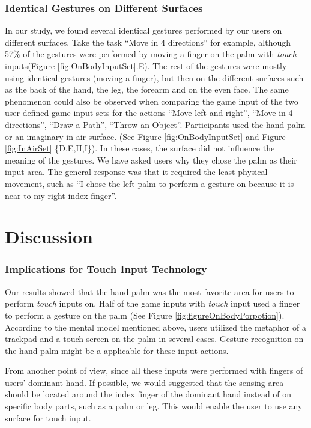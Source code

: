 \documentclass{sigchi}
\begin{document}
\subsubsection{Identical Gestures on Different Surfaces}
 In our study, we found several identical gestures performed by our users on different surfaces. Take the task ``Move in 4 directions'' for example, although 57\% of the gestures were performed by moving a finger on the palm with \emph{touch} inputs(Figure \ref{fig:OnBodyInputSet}.E). The rest of the gestures were mostly using identical gestures (moving a finger), but then on the different surfaces such as the back of the hand, the leg, the forearm and on the even face. The same phenomenon could also be observed when comparing the game input of the two user-defined game input sets for the actions ``Move left and right'', ``Move in 4 directions'', ``Draw a Path'', ``Throw an Object''. Participants used the hand palm or an imaginary in-air surface. 
 (See Figure \ref{fig:OnBodyInputSet} and Figure \ref{fig:InAirSet} \{D,E,H,I\}). In these cases, the surface did not influence the meaning of the gestures. We have asked users why they chose the palm as their input area. The general response was that it required the least physical movement, such as ``I chose the left palm to perform a gesture on because it is near to my right index finger''. 

  \section{Discussion}

    \subsubsection{Implications for Touch Input Technology}
    Our results showed that the hand palm was the most favorite area for users to perform \emph{touch} inputs on. Half of the game inputs with \emph{touch} input used a finger to perform a gesture on the palm (See Figure \ref{fig:figureOnBodyPorpotion}). According to the mental model mentioned above, users utilized the metaphor of a trackpad and a touch-screen on the palm in several cases. Gesture-recognition on the hand palm might be a applicable for these input actions.

    From another point of view, since all these inputs were performed with fingers of users' dominant hand. If possible, we would suggested that the sensing area should be located around the index finger of the dominant hand instead of on specific body parts, such as a palm or leg. This would enable the user to use any surface for touch input. 
\end{document}
